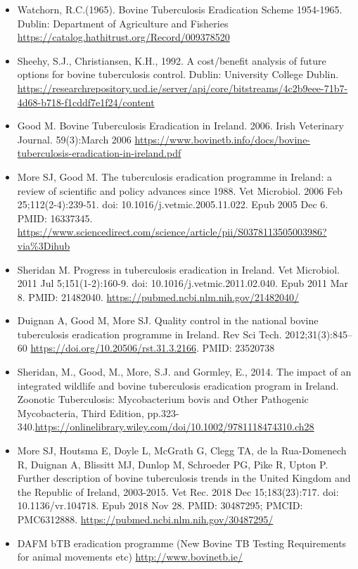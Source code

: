\documentclass[
  letterpaper,
  DIV=11,
  numbers=noendperiod]{scrreprt}
\begin{document}
\begin{itemize}
\item
  Watchorn, R.C.(1965). Bovine Tuberculosis Eradication Scheme
  1954-1965. Dublin: Department of Agriculture and Fisheries
  \url{https://catalog.hathitrust.org/Record/009378520}
\item
  Sheehy, S.J., Christiansen, K.H., 1992. A cost/benefit analysis of
  future options for bovine tuberculosis control. Dublin: University
  College Dublin.
  \url{https://researchrepository.ucd.ie/server/api/core/bitstreams/4c2b9eee-71b7-4d68-b718-f1cddf7e1f24/content}
\item
  Good M. Bovine Tuberculosis Eradication in Ireland. 2006. Irish
  Veterinary Journal. 59(3):March 2006
  \url{https://www.bovinetb.info/docs/bovine-tuberculosis-eradication-in-ireland.pdf}
\item
  More SJ, Good M. The tuberculosis eradication programme in Ireland: a
  review of scientific and policy advances since 1988. Vet Microbiol.
  2006 Feb 25;112(2-4):239-51. doi: 10.1016/j.vetmic.2005.11.022. Epub
  2005 Dec 6. PMID: 16337345.
  \url{https://www.sciencedirect.com/science/article/pii/S0378113505003986?via\%3Dihub}
\item
  Sheridan M. Progress in tuberculosis eradication in Ireland. Vet
  Microbiol. 2011 Jul 5;151(1-2):160-9. doi:
  10.1016/j.vetmic.2011.02.040. Epub 2011 Mar 8. PMID: 21482040.
  \url{https://pubmed.ncbi.nlm.nih.gov/21482040/}
\item
  Duignan A, Good M, More SJ. Quality control in the national bovine
  tuberculosis eradication programme in Ireland. Rev Sci Tech.
  2012;31(3):845--60 \url{https://doi.org/10.20506/rst.31.3.2166}. PMID:
  23520738
\item
  Sheridan, M., Good, M., More, S.J. and Gormley, E., 2014. The impact
  of an integrated wildlife and bovine tuberculosis eradication program
  in Ireland. Zoonotic Tuberculosis: Mycobacterium bovis and Other
  Pathogenic Mycobacteria, Third Edition,
  pp.323-340.\url{https://onlinelibrary.wiley.com/doi/10.1002/9781118474310.ch28}
\item
  More SJ, Houtsma E, Doyle L, McGrath G, Clegg TA, de la Rua-Domenech
  R, Duignan A, Blissitt MJ, Dunlop M, Schroeder PG, Pike R, Upton P.
  Further description of bovine tuberculosis trends in the United
  Kingdom and the Republic of Ireland, 2003-2015. Vet Rec. 2018 Dec
  15;183(23):717. doi: 10.1136/vr.104718. Epub 2018 Nov 28. PMID:
  30487295; PMCID: PMC6312888.
  \url{https://pubmed.ncbi.nlm.nih.gov/30487295/}
\item
  DAFM bTB eradication programme (New Bovine TB Testing Requirements for
  animal movements etc) \url{http://www.bovinetb.ie/}
\end{itemize}
\end{document}
